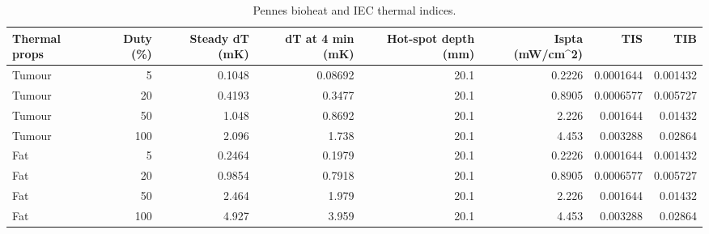 \begin{table}
\caption{Pennes bioheat and IEC thermal indices.}
\label{tab:T_S7_thermal}
\begin{tabular}{lrrrrrrr}
\toprule
Thermal props & Duty (\%) & Steady dT (mK) & dT at 4 min (mK) & Hot-spot depth (mm) & Ispta (mW/cm\textasciicircum 2) & TIS & TIB \\
\midrule
Tumour & 5 & 0.1048 & 0.08692 & 20.1 & 0.2226 & 0.0001644 & 0.001432 \\
Tumour & 20 & 0.4193 & 0.3477 & 20.1 & 0.8905 & 0.0006577 & 0.005727 \\
Tumour & 50 & 1.048 & 0.8692 & 20.1 & 2.226 & 0.001644 & 0.01432 \\
Tumour & 100 & 2.096 & 1.738 & 20.1 & 4.453 & 0.003288 & 0.02864 \\
Fat & 5 & 0.2464 & 0.1979 & 20.1 & 0.2226 & 0.0001644 & 0.001432 \\
Fat & 20 & 0.9854 & 0.7918 & 20.1 & 0.8905 & 0.0006577 & 0.005727 \\
Fat & 50 & 2.464 & 1.979 & 20.1 & 2.226 & 0.001644 & 0.01432 \\
Fat & 100 & 4.927 & 3.959 & 20.1 & 4.453 & 0.003288 & 0.02864 \\
\bottomrule
\end{tabular}
\end{table}
